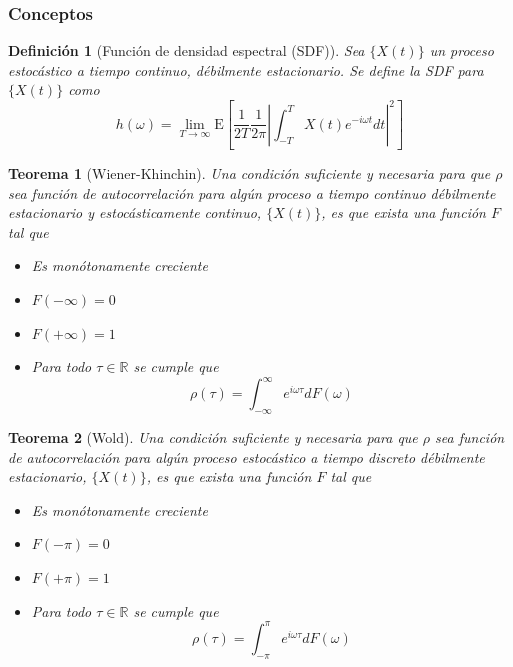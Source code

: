 \documentclass{beamer}
\newtheorem{defn}{Definici\'on}
\newtheorem{thrm}{Teorema}
\newcommand{\R}{\mathbb{R}}
\newcommand{\intR}{\int_{-\infty}^{\infty}}
\newcommand{\intPI}{\int_{-\pi}^{\pi}}
\newcommand{\E}[1]{\mathrm{E}\left[ #1 \right]}
\newcommand{\abso}[1]{\left| #1 \right|}
\begin{document}

\begin{frame}\frametitle{Conceptos}
\begin{defn}[Funci\'on de densidad espectral (SDF)]
Sea $\{X(t)\}$ un proceso estoc\'astico a tiempo continuo, d\'ebilmente estacionario. 
Se define la SDF para $\{X(t)\}$ como
\begin{equation*}
h(\omega) = \lim_{T\rightarrow \infty} \E{ \frac{1}{2T} \frac{1}{2 \pi}
\abso{ \int_{-T}^{T} X(t) e^{-i \omega t} dt}^{2} }
\end{equation*}
\label{SDF}
\end{defn}
\end{frame}


\begin{frame}%
\begin{thrm}[Wiener-Khinchin]
Una condici\'on suficiente y necesaria para que
$\rho$ sea funci\'on de autocorrelaci\'on para alg\'un proceso a tiempo continuo d\'ebilmente 
estacionario y estoc\'asticamente continuo, $\{X(t)\}$,  es que exista una funci\'on $F$ tal que
\begin{itemize}
\item Es mon\'otonamente creciente
\item $F(-\infty) = 0$
\item $F(+\infty) = 1$
\item Para todo $\tau \in \R$ se cumple que
\begin{equation*}
\rho(\tau) = \intR e^{i \omega \tau} dF(\omega)
\end{equation*}
\end{itemize}
\end{thrm}
\end{frame}


\begin{frame}%
\begin{thrm}[Wold]
Una condici\'on suficiente y necesaria para que $\rho$ sea funci\'on de autocorrelaci\'on para
alg\'un proceso estoc\'astico a tiempo discreto d\'ebilmente estacionario, $\{X(t)\}$, es que exista 
una funci\'on $F$ tal que
\begin{itemize}
\item Es mon\'otonamente creciente
\item $F(-\pi) = 0$
\item $F(+\pi) = 1$
\item Para todo $\tau \in \R$ se cumple que
\begin{equation*}
\rho(\tau) = \intPI e^{i \omega \tau} dF(\omega)
\end{equation*}
\end{itemize}
\end{thrm}
\end{frame}
\end{document}
